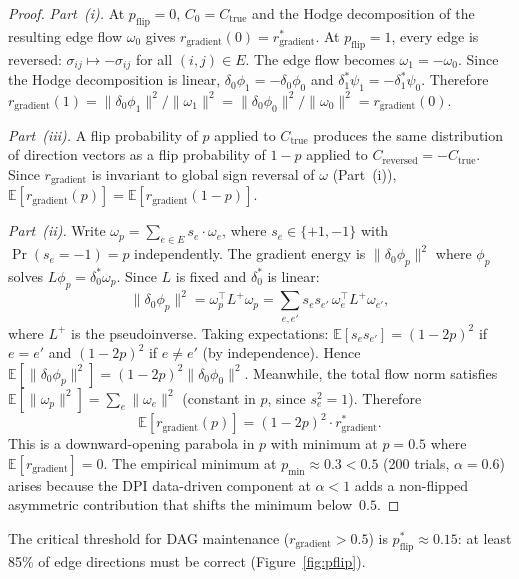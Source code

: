 \documentclass[twoside,11pt]{article}
\begin{document}
\begin{proof}
\emph{Part~(i).}
At $p_{\mathrm{flip}}=0$, $C_0=C_{\mathrm{true}}$ and the Hodge
decomposition of the resulting edge flow $\omega_0$ gives
$r_{\mathrm{gradient}}(0)=r_{\mathrm{gradient}}^*$.  At
$p_{\mathrm{flip}}=1$, every edge is reversed:
$\sigma_{ij}\mapsto-\sigma_{ij}$ for all $(i,j)\in E$.  The edge flow
becomes $\omega_1=-\omega_0$.  Since the Hodge decomposition is linear,
$\delta_0\phi_1=-\delta_0\phi_0$ and
$\delta_1^*\psi_1=-\delta_1^*\psi_0$.  Therefore
$r_{\mathrm{gradient}}(1) =
\|\delta_0\phi_1\|^2/\|\omega_1\|^2 =
\|\delta_0\phi_0\|^2/\|\omega_0\|^2 = r_{\mathrm{gradient}}(0)$.

\emph{Part~(iii).}
A flip probability of $p$ applied to $C_{\mathrm{true}}$ produces the
same distribution of direction vectors as a flip probability of $1-p$
applied to $C_{\mathrm{reversed}}=-C_{\mathrm{true}}$.  Since
$r_{\mathrm{gradient}}$ is invariant to global sign reversal of $\omega$
(Part~(i)), $\mathbb{E}[r_{\mathrm{gradient}}(p)] =
\mathbb{E}[r_{\mathrm{gradient}}(1-p)]$.

\emph{Part~(ii).}
Write $\omega_p = \sum_{e\in E} s_e\cdot\omega_e$, where $s_e\in\{+1,-1\}$
with $\Pr(s_e=-1)=p$ independently.  The gradient energy is
$\|\delta_0\phi_p\|^2$ where $\phi_p$ solves $L\phi_p=\delta_0^*\omega_p$.
Since $L$ is fixed and $\delta_0^*$ is linear:
\[
  \|\delta_0\phi_p\|^2 = \omega_p^\top L^+\omega_p
  = \sum_{e,e'} s_e s_{e'}\,\omega_e^\top L^+\omega_{e'},
\]
where $L^+$ is the pseudoinverse.  Taking expectations:
$\mathbb{E}[s_e s_{e'}] = (1-2p)^2$ if $e=e'$ and $(1-2p)^2$ if
$e\ne e'$ (by independence).  Hence
$\mathbb{E}[\|\delta_0\phi_p\|^2] = (1-2p)^2\|\delta_0\phi_0\|^2$.
Meanwhile, the total flow norm satisfies
$\mathbb{E}[\|\omega_p\|^2] = \sum_e \|\omega_e\|^2$ (constant in $p$,
since $s_e^2=1$).  Therefore
\[
  \mathbb{E}[r_{\mathrm{gradient}}(p)]
  = (1-2p)^2\cdot r_{\mathrm{gradient}}^*.
\]
This is a downward-opening parabola in $p$ with minimum at
$p=0.5$ where $\mathbb{E}[r_{\mathrm{gradient}}]=0$.  The empirical
minimum at $p_{\min}\approx 0.3<0.5$ (200 trials, $\alpha=0.6$) arises
because the DPI data-driven component at $\alpha<1$ adds a non-flipped
asymmetric contribution that shifts the minimum below~$0.5$.
\end{proof}

The critical threshold for DAG maintenance
($r_{\mathrm{gradient}}>0.5$) is
$p_{\mathrm{flip}}^*\approx 0.15$: at least 85\% of edge directions
must be correct (Figure~\ref{fig:pflip}).
\end{document}
